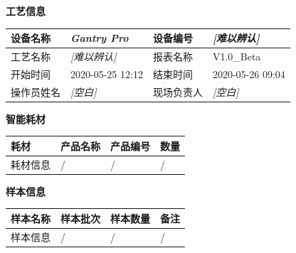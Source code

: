 \documentclass[UTF8,10pt,a4paper,fontset=fandol]{ctexart}
\newcommand{\fieldvalue}[1]{#1}
\begin{document}
\begin{minipage}[t]{0.48\textwidth}
\textbf{工艺信息}

\small
\begin{tabularx}{\linewidth}{|l|X|l|X|}
\hline
设备名称 & 
\fieldvalue{\textit{Gantry Pro}} &
设备编号 &
\fieldvalue{\textit{[难以辨认]}} \\
\hline
工艺名称 &
\fieldvalue{\textit{[难以辨认]}} &
报表名称 &
\fieldvalue{V1.0\_Beta} \\
\hline
开始时间 &
\fieldvalue{2020-05-25 12:12} &
结束时间 &
\fieldvalue{2020-05-26 09:04} \\
\hline
操作员姓名 &
\fieldvalue{\textit{[空白]}} &
现场负责人 &
\fieldvalue{\textit{[空白]}} \\
\hline
\end{tabularx}

\vspace{2mm}
\textbf{智能耗材}

\begin{tabularx}{\linewidth}{|l|X|l|X|}
\hline
耗材 & 产品名称 & 产品编号 & 数量 \\
\hline
耗材信息 &
\fieldvalue{/} &
\fieldvalue{/} &
\fieldvalue{/} \\
\hline
\end{tabularx}

\vspace{2mm}
\textbf{样本信息}

\begin{tabularx}{\linewidth}{|l|X|l|X|}
\hline
样本名称 & 样本批次 & 样本数量 & 备注 \\
\hline
样本信息 &
\fieldvalue{/} &
\fieldvalue{/} &
\fieldvalue{/} \\
\hline
\end{tabularx}


\end{minipage}
\end{document}
